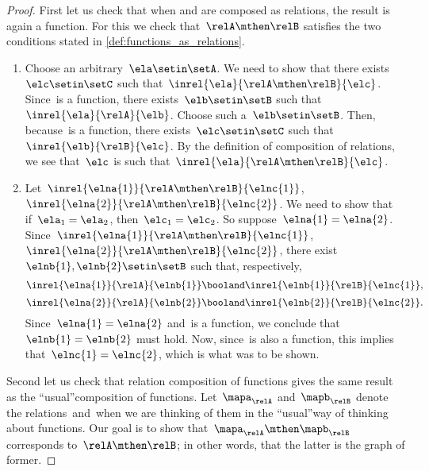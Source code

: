 \begin{proof}
    First let us check that when \relA and \relB are composed as relations, the result is again a function.
    For this we check that~$\relA \mthen \relB$ satisfies the two conditions stated in \cref{def:functions_as_relations}.

    \begin{enumerate}
        \item Choose an arbitrary~$\ela \setin \setA$.
              We need to show that there exists~$\elc \setin \setC$ such that~$\inrel{\ela}{\relA \mthen \relB}{\elc}$.
              Since~\relA is a function, there exists~$\elb \setin \setB$ such that~$\inrel{\ela}{\relA}{\elb}$.
              Choose such a~$\elb \setin \setB$.
              Then, because~\relB is a function, there exists~$\elc \setin \setC$ such that~$\inrel{\elb}{\relB}{\elc}$.
              By the definition of composition of relations, we see that~$\elc$ is such that~$\inrel{\ela}{\relA \mthen \relB}{\elc}$.
        \item Let~$\inrel{\elna{1}}{\relA \mthen \relB}{\elnc{1}}$,~$\inrel{\elna{2}}{\relA \mthen \relB}{\elnc{2}}$.
              We need to show that if~$\ela_1 = \ela_2$, then~$\elc_1 = \elc_2$.
              So suppose~$\elna{1} = \elna{2}$.
              Since~$\inrel{\elna{1}}{\relA \mthen \relB}{\elnc{1}}$,~$\inrel{\elna{2}}{\relA \mthen \relB}{\elnc{2}}$, there exist~$\elnb{1}, \elnb{2} \setin \setB$ such that, respectively,
              \begin{equation}
                  \inrel{\elna{1}}{\relA}{\elnb{1}} \booland \inrel{\elnb{1}}{\relB}{\elnc{1}},
              \end{equation}
              \begin{equation}
                  \inrel{\elna{2}}{\relA}{\elnb{2}} \booland \inrel{\elnb{2}}{\relB}{\elnc{2}}.
              \end{equation}
              Since~$\elna{1} = \elna{2}$ and~\relA is a function, we conclude that~$\elnb{1} = \elnb{2}$ must hold.
              Now, since~\relB is also a function, this implies that~$\elnc{1} = \elnc{2}$, which is what was to be shown.
    \end{enumerate}

    Second let us check that relation composition of functions gives the same result as the ``usual''composition of functions.
    Let~$\mapa_\relA$ and~$\mapb_\relB$ denote the relations~\relA and~\relB when we are thinking of them in the ``usual''way of thinking about functions.
    Our goal is to show that~$\mapa_\relA \mthen \mapb_\relB$ corresponds to~$\relA \mthen \relB$; in other words, that the latter is the graph of former.


\end{proof}

